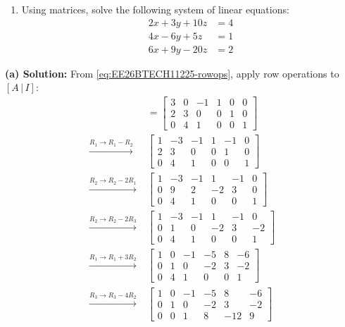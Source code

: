 \begin{enumerate}[label=\thesubsection.\arabic*, ref=\thesubsection.\theenumi]
\begin{enumerate}[label=(\alph*), leftmargin=1.5em, labelsep=0.5em]
        \item Using matrices, solve the following system of linear equations:
        \begin{align*}
            2x+3y+10z &= 4 \\
            4x-6y+5z &= 1 \\
            6x+9y-20z &= 2
        \end{align*}
    \end{enumerate} \vspace{2pt}
    \textbf{(a) Solution:} From \eqref{eq:EE26BTECH11225-rowops}, apply row operations to $[A\,|\,I]$:
\begin{align}
    [A|I] &= \left[\begin{array}{ccc|ccc} 3 & 0 & -1 & 1 & 0 & 0 \\ 2 & 3 & 0 & 0 & 1 & 0 \\ 0 & 4 & 1 & 0 & 0 & 1 \end{array}\right] \\
    \xrightarrow{R_1\to R_1-R_2}\; &\left[\begin{array}{ccc|ccc} 1 & -3 & -1 & 1 & -1 & 0 \\ 2 & 3 & 0 & 0 & 1 & 0 \\ 0 & 4 & 1 & 0 & 0 & 1 \end{array}\right] \\
    \xrightarrow{R_2\to R_2-2R_1}\; &\left[\begin{array}{ccc|ccc} 1 & -3 & -1 & 1 & -1 & 0 \\ 0 & 9 & 2 & -2 & 3 & 0 \\ 0 & 4 & 1 & 0 & 0 & 1 \end{array}\right] \\
    \xrightarrow{R_2\to R_2-2R_3}\; &\left[\begin{array}{ccc|ccc} 1 & -3 & -1 & 1 & -1 & 0 \\ 0 & 1 & 0 & -2 & 3 & -2 \\ 0 & 4 & 1 & 0 & 0 & 1 \end{array}\right] \\
    \xrightarrow{R_1\to R_1+3R_2}\; &\left[\begin{array}{ccc|ccc} 1 & 0 & -1 & -5 & 8 & -6 \\ 0 & 1 & 0 & -2 & 3 & -2 \\ 0 & 4 & 1 & 0 & 0 & 1 \end{array}\right] \\
    \xrightarrow{R_3\to R_3-4R_2}\; &\left[\begin{array}{ccc|ccc} 1 & 0 & -1 & -5 & 8 & -6 \\ 0 & 1 & 0 & -2 & 3 & -2 \\ 0 & 0 & 1 & 8 & -12 & 9 \end{array}\right] \\

\end{align}
\end{enumerate}
